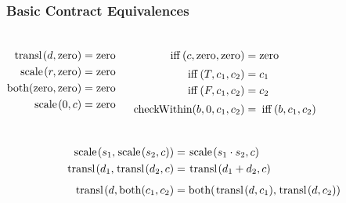 \documentclass[xcolor=dvipsnames,11pt]{beamer}
\newcommand{\ttt}[1]{\mbox{\cd{#1}}}
\newcommand{\zero}{\ttt{zero}}
\newcommand{\scale}{\ttt{scale}}
\newcommand{\transl}{\ttt{transl}}
\newcommand{\both}{\ttt{both}}
\newcommand{\ifff}{\ttt{iff}}
\newcommand{\checkWithin}{\ttt{checkWithin}}
\begin{document}
\begin{frame}\frametitle{Basic Contract Equivalences}{\footnotesize

\begin{columns}
\begin{align*}
    \transl(d,\zero)             &=  \zero\\
    \scale(r,\zero)              &=  \zero\\
    \both(\zero,\zero)           &=  \zero\\
    \scale(0,c)                  &=  \zero\\
\end{align*}

\begin{align*}
    \ifff(c,\zero,\zero)        &= \zero\\[0.5ex]
    \ifff(T,c_1,c_2)            &=  c_1\\
    \ifff(F,c_1,c_2)            &=  c_2\\[0.5ex]
    \checkWithin(b,0,c_1,c_2)   &= \ifff(b,c_1,c_2) \\
\end{align*}
\end{columns}

\begin{align*}
    \scale(s_1,\scale(s_2,c))    &=  \scale(s_1\cdot s_2,c)\\
    \transl(d_1,\transl(d_2,c)   &=  \transl(d_1+d_2,c)\\[1ex]
    \transl(d,\both(c_1,c_2)     &=  \both(\transl(d,c_1),\transl(d,c_2))\\[1ex]
\end{align*}

}\end{frame}
\end{document}
